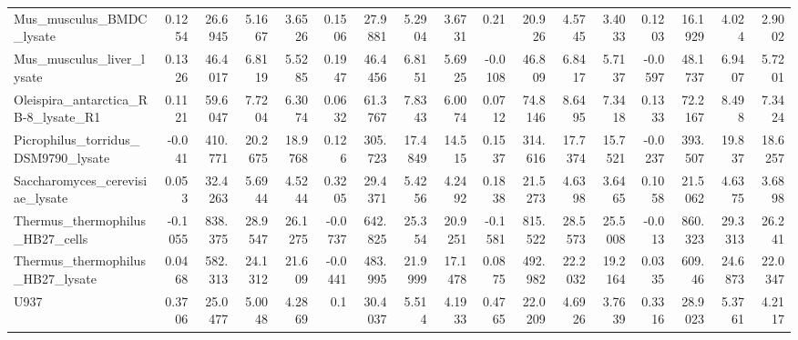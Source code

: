 \begin{tabular}{lrrrrrrrrrrrrrrrr}
 Mus\_musculus\_BMDC\_lysate                    &              0.1254   &          26.6945 &           5.1667  &           3.6526 &         0.1506   &     27.9881 &      5.2904  &     3.6731  &       0.21     &   20.926  &    4.5745  &   3.4033  &         0.1203   &     16.1929 &       4.024  &     2.9002  \\
 Mus\_musculus\_liver\_lysate                   &              0.1326   &          46.4017 &           6.8119  &           5.5285 &         0.1947   &     46.4456 &      6.8151  &     5.6925  &      -0.0108   &   46.809  &    6.8417  &   5.7137  &        -0.0597   &     48.1737 &       6.9407 &     5.7201  \\
 Oleispira\_antarctica\_RB-8\_lysate\_R1         &              0.1121   &          59.6047 &           7.7204  &           6.3074 &         0.0632   &     61.3767 &      7.8343  &     6.0074  &       0.0712   &   74.8146 &    8.6495  &   7.3418  &         0.1333   &     72.2167 &       8.498  &     7.3424  \\
 Picrophilus\_torridus\_DSM9790\_lysate         &             -0.041    &         410.771  &          20.2675  &          18.9768 &         0.126    &    305.723  &     17.4849  &    14.515   &       0.1537   &  314.616  &   17.7374  &  15.7521  &        -0.0237   &    393.507  &      19.837  &    18.6257  \\
 Saccharomyces\_cerevisiae\_lysate             &              0.053    &          32.4263 &           5.6944  &           4.5244 &         0.3205   &     29.4371 &      5.4256  &     4.2492  &       0.1838   &   21.5273 &    4.6398  &   3.6465  &         0.1058   &     21.5062 &       4.6375 &     3.6898  \\
 Thermus\_thermophilus\_HB27\_cells             &             -0.1055   &         838.375  &          28.9547  &          26.1275 &        -0.0737   &    642.825  &     25.354   &    20.9251  &      -0.1581   &  815.522  &   28.5573  &  25.5008  &        -0.013    &    860.323  &      29.3313 &    26.241   \\
 Thermus\_thermophilus\_HB27\_lysate            &              0.0468   &         582.313  &          24.1312  &          21.609  &        -0.0441   &    483.995  &     21.9999  &    17.1478  &       0.0875   &  492.982  &   22.2032  &  19.2164  &         0.0335   &    609.46   &      24.6873 &    22.0347  \\
 U937                                        &              0.3706   &          25.0477 &           5.0048  &           4.2869 &         0.1      &     30.4037 &      5.514   &     4.1933  &       0.4765   &   22.0209 &    4.6926  &   3.7639  &         0.3316   &     28.9023 &       5.3761 &     4.2117  \\

\end{tabular}
